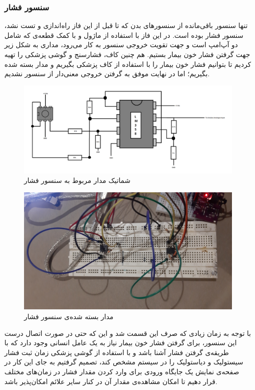 \documentclass[12pt]{article}
\begin{document}
\subsubsection{سنسور فشار}

تنها سنسور باقی‌مانده از سنسورهای بدن که تا قبل از این فاز راه‌اندازی و تست نشد، سنسور فشار بوده است. در این فاز با استفاده از ماژول  و با کمک قطعه‌ی  که شامل دو آپ‌امپ است و جهت تقویت خروجی سنسور به کار می‌رود، مداری به شکل زیر جهت گرفتن فشار خون بیمار بستیم. هم چنین کاف، فشارسنج و گوشی پزشکی را تهیه کردیم تا بتوانیم فشار خون بیمار را با استفاده از کاف پزشکی بگیریم و مدار بسته شده بگیریم؛ اما در نهایت موفق به گرفتن خروجی معنی‌دار از سنسور نشدیم. 


\begin{figure}[H]
	\begin{center}
		\includegraphics[width=.80\textwidth]{images/pressure-3.png}
	\end{center}
	\caption{شماتیک مدار مربوط به سنسور فشار}
\end{figure}

\begin{figure}[H]
	\begin{center}
		\includegraphics[width=.80\textwidth]{images/pressure-1.jpg}
	\end{center}
	\caption{مدار بسته‌ شده‌ی سنسور فشار}
\end{figure}


با توجه به زمان زیادی که صرف این قسمت شد و این که حتی در صورت اتصال درست این سنسور، برای گرفتن فشار خون بیمار نیاز به یک عامل انسانی وجود دارد که با طریقه‌ی گرفتن فشار آشنا باشد و با استفاده از گوشی پزشکی زمان ثبت فشار سیستولیک و دیاستولیک را در سیستم مشخص کند، تصمیم گرفتیم به جای این کار در صفحه‌ی نمایش یک جایگاه ورودی برای وارد کردن مقدار فشار در زمان‌های مختلف قرار دهیم تا امکان مشاهده‌ی مقدار آن در کنار سایر علائم امکان‌پذیر باشد.
\end{document}
